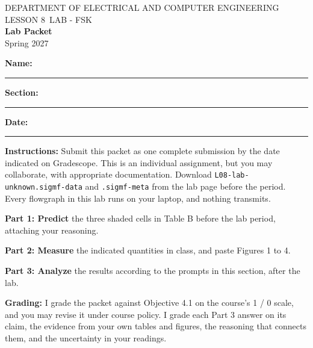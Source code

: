 \documentclass{exam}
\def\labLesson{8}
\def\thisterm{\thisTermIn}
\def\thisterm{Spring 2027}
\begin{document}
\pagestyle{headandfoot}
\begin{Form}

\begin{center}
DEPARTMENT OF ELECTRICAL AND COMPUTER ENGINEERING \\
LESSON \labLesson\ LAB - FSK \\
\textbf{Lab Packet} \\
\thisterm \\[4mm]
\end{center}

\vspace{-4pt}
\textbf{Name:} \rule[-2pt]{2.6in}{0.4pt} \hfill
\textbf{Section:} \rule[-2pt]{0.9in}{0.4pt} \hfill
\textbf{Date:} \rule[-2pt]{1.1in}{0.4pt}

\vspace{4pt}


\textbf{Instructions:} Submit this packet as one complete submission by the date indicated on
Gradescope. This is an individual assignment, but you may collaborate, with appropriate
documentation. Download \texttt{L08-lab-unknown.sigmf-data} and \texttt{.sigmf-meta} from
the lab page before the period. Every flowgraph in this lab runs on your laptop, and nothing
transmits.

\textbf{Part 1: Predict} the three shaded cells in Table B before the lab period, attaching your
reasoning.

\textbf{Part 2: Measure} the indicated quantities in class, and paste Figures 1 to 4.

\textbf{Part 3: Analyze} the results according to the prompts in this section, after the lab.

\textbf{Grading:} I grade the packet against Objective 4.1 on the course's 1 / 0 scale, and you
may revise it under course policy. I grade each Part 3 answer on its claim, the evidence from
your own tables and figures, the reasoning that connects them, and the uncertainty in your
readings.

\begin{procbox}
\end{procbox}


\end{Form}
\end{document}

